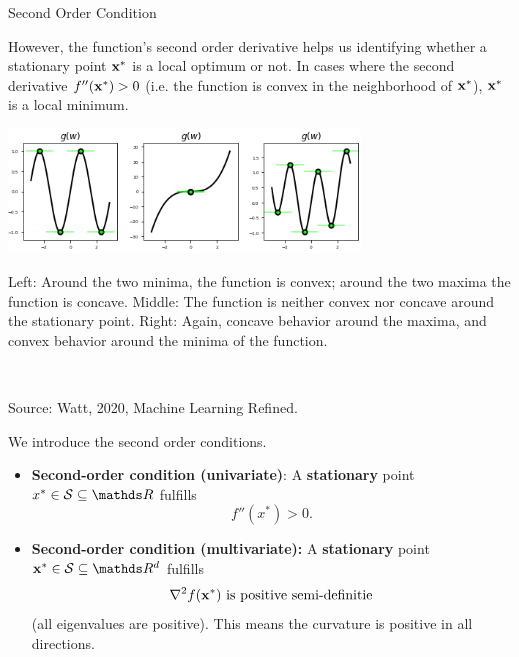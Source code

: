   \begin{vbframe}{Second Order Condition}
  
  However, the function's second order derivative helps us identifying whether a stationary point $\mathbf{x}^\ast$ is a local optimum or not. In cases where the second derivative $f''(\mathbf{x}^\ast)> 0$ (i.e. the function is convex in the neighborhood of $\mathbf{x}^\ast$), $\mathbf{x}^\ast$ is a local minimum. 
  
  \begin{center}
  \includegraphics[width = 0.7\textwidth]{figure_man/saddle_points_2.png} \\
  \begin{footnotesize}
  Left: Around the two minima, the function is convex; around the two maxima the function is concave. Middle: The function is neither convex nor concave around the stationary point. Right: Again, concave behavior around the maxima, and convex behavior around the minima of the function. 
  \end{footnotesize}\\
  \begin{tiny}
  Source: Watt, 2020, Machine Learning Refined. 
  \end{tiny}
  \end{center}
  
  
  \framebreak 
  
  
  We introduce the second order conditions. 
  
  \begin{itemize}
    \item \textbf{Second-order condition (univariate)}: A \textbf{stationary} point $x^\ast \in \mathcal{S}\subseteq \R$ fulfills
    $$f''(x^\ast) > 0.$$ 
    \item \textbf{Second-order condition (multivariate): } A \textbf{stationary} point $\xv^\ast \in \mathcal{S}\subseteq \R^d$ fulfills $$\nabla^2 f(\mathbf{x}^\ast) \text{ is positive semi-definitie}$$  (all eigenvalues are positive). This means the curvature is positive in all directions. 
  
  \end{itemize}
  
  \lz 
  

\end{vbframe}
